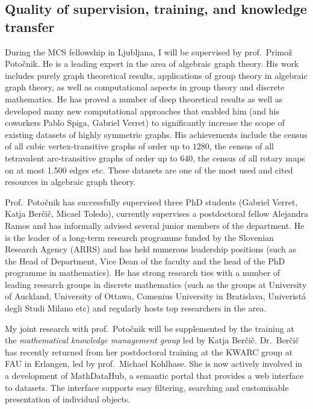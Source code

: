 \subsection{Quality of supervision, training, and knowledge transfer}
\label{sec:training}

During the MCS fellowship in Ljubljana, I will be supervised by prof.\ Primož Potočnik. 
He is a leading expert in the area of algebraic graph theory. His work includes purely graph theoretical
results, applications of group theory in algebraic graph theory, as well as computational aspects in group theory and discrete mathematics.
He has proved a number of deep theoretical results as well as developed many new computational approaches that enabled him (and his coworkers Pablo Spiga, Gabriel Verret) to significantly increase the scope of existing datasets of highly symmetric graphs. His achievements include the census of all
cubic vertex-transitive graphs of order up to $1280$, the census of all tetravalent arc-transitive graphs of order up to $640$, the census of all
rotary maps on at most 1.500 edges etc. These datasets are one of the most used and cited resources in algebraic graph theory.

Prof.\ Potočnik has successfully supervised three PhD students (Gabriel Verret, Katja Berčič, Micael Toledo), currently supervises
a postdoctoral fellow Alejandra Ramos and has informally advised several junior members of the department.
He is the leader
of a long-term research programme funded by the Slovenian Research Agency (ARRS) and has held numerous leadership positions
(such as the Head of Department, Vice Dean of the faculty and the head of the PhD programme in mathematics).
 He has strong research ties with a number of leading research groups in discrete mathematics (such as the groups at University of Auckland, University of Ottawa, Comenius University in Bratislava, Univerist\'a degli Studi Milano etc) and regularly hosts top researchers in the area.

My joint research with prof.\ Potočnik will be supplemented by the training at the {\em mathematical knowledge management group} led by Katja Berčič.
Dr.\ Berčič has recently returned from her postdoctoral training at the KWARC group at FAU in Erlangen, led by
prof.\ Michael Kohlhase. She is now actively involved in a development of MathDataHub, a semantic portal that provides a web interface to datasets. The interface supports easy filtering, searching and customisable presentation of individual objects.


